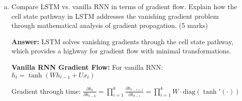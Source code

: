\documentclass[12pt]{article}
\newcommand{\answer}[1]{{\color{answercolor}\textbf{Answer:} #1}}
\newcommand{\explanation}[1]{{\color{explanationcolor}#1}}
\begin{document}
\begin{enumerate}[(a)]
    \answer{Complete LSTM equations with proper weight matrices and activation functions:}
    
    \explanation{
    \textbf{LSTM Mathematical Formulation:}
    
    \textbf{1. Forget Gate:} Controls what to forget from previous cell state
    $$f_t = \sigma(W_f \cdot [h_{t-1}, x_t] + b_f)$$
    
    \textbf{2. Input Gate:} Controls what new information to store
    $$i_t = \sigma(W_i \cdot [h_{t-1}, x_t] + b_i)$$
    
    \textbf{3. Candidate Values:} New candidate values to potentially store
    $$\tilde{C}_t = \tanh(W_C \cdot [h_{t-1}, x_t] + b_C)$$
    
    \textbf{4. Cell State Update:} Combines forgotten old state with new candidates
    $$C_t = f_t \odot C_{t-1} + i_t \odot \tilde{C}_t$$
    
    \textbf{5. Output Gate:} Controls what parts of cell state to output
    $$o_t = \sigma(W_o \cdot [h_{t-1}, x_t] + b_o)$$
    
    \textbf{6. Hidden State:} Filtered version of cell state
    $$h_t = o_t \odot \tanh(C_t)$$
    
    \textbf{Key Insights:}
    \begin{itemize}
        \item $\sigma$ is the sigmoid function (outputs 0-1 for gating)
        \item $\tanh$ normalizes values to [-1, 1]
        \item $\odot$ denotes element-wise multiplication
        \item $[h_{t-1}, x_t]$ represents concatenation of vectors
    \end{itemize}
    }
    
    \item Compare LSTM vs. vanilla RNN in terms of gradient flow. Explain how the cell state pathway in LSTM addresses the vanishing gradient problem through mathematical analysis of gradient propagation. \hfill (5 marks)
    
    \answer{LSTM solves vanishing gradients through the cell state pathway, which provides a highway for gradient flow with minimal transformations.}
    
    \explanation{
    \textbf{Vanilla RNN Gradient Flow:}
    For vanilla RNN: $h_t = \tanh(Wh_{t-1} + Ux_t)$
    
    Gradient through time: $\frac{\partial h_t}{\partial h_{t-k}} = \prod_{i=1}^k \frac{\partial h_{t-i+1}}{\partial h_{t-i}} = \prod_{i=1}^k W \cdot \text{diag}(\tanh'(\cdot))$
    
}
\end{enumerate}
\end{document}
